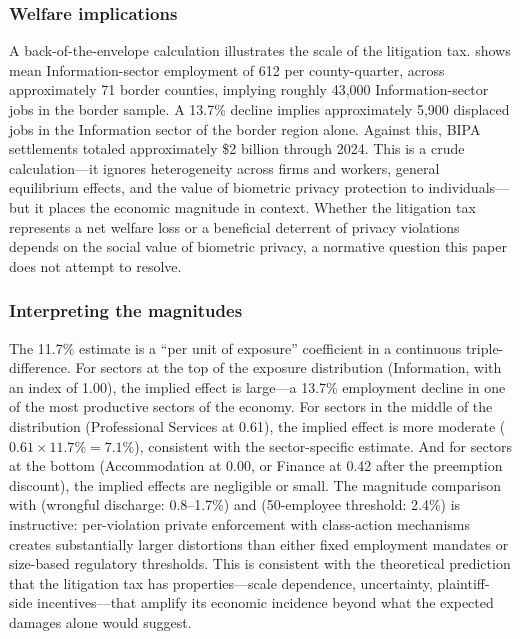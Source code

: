 \documentclass[12pt]{article}
\begin{document}
\subsubsection*{Welfare implications} A back-of-the-envelope calculation illustrates the scale of the litigation tax.  shows mean Information-sector employment of 612 per county-quarter, across approximately 71 border counties, implying roughly 43,000 Information-sector jobs in the border sample. A 13.7\% decline implies approximately 5,900 displaced jobs in the Information sector of the border region alone. Against this, BIPA settlements totaled approximately \$2 billion through 2024. This is a crude calculation---it ignores heterogeneity across firms and workers, general equilibrium effects, and the value of biometric privacy protection to individuals---but it places the economic magnitude in context. Whether the litigation tax represents a net welfare loss or a beneficial deterrent of privacy violations depends on the social value of biometric privacy, a normative question this paper does not attempt to resolve.

\subsubsection*{Interpreting the magnitudes} The 11.7\% estimate is a ``per unit of exposure'' coefficient in a continuous triple-difference. For sectors at the top of the exposure distribution (Information, with an index of 1.00), the implied effect is large---a 13.7\% employment decline in one of the most productive sectors of the economy. For sectors in the middle of the distribution (Professional Services at 0.61), the implied effect is more moderate ($0.61 \times 11.7\% = 7.1\%$), consistent with the sector-specific estimate. And for sectors at the bottom (Accommodation at 0.00, or Finance at 0.42 after the preemption discount), the implied effects are negligible or small. The magnitude comparison with \citet{autordsh2006} (wrongful discharge: 0.8--1.7\%) and \citet{garicano2016} (50-employee threshold: 2.4\%) is instructive: per-violation private enforcement with class-action mechanisms creates substantially larger distortions than either fixed employment mandates or size-based regulatory thresholds. This is consistent with the theoretical prediction that the litigation tax has properties---scale dependence, uncertainty, plaintiff-side incentives---that amplify its economic incidence beyond what the expected damages alone would suggest.
\end{document}
